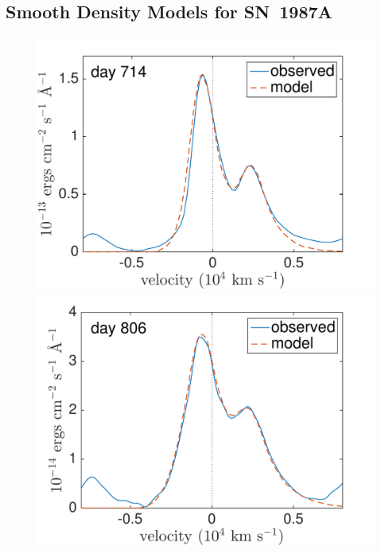 \subsection{Smooth Density Models for SN~1987A}
\label{smooth_models}
\begin{figure}
\centering
\includegraphics[trim =0 33 0 0,clip=true,scale=0.37]{chapters/chapter5/images/smooth/best_fit/d714OI.pdf}
\hspace{0mm}
\includegraphics[trim = 0 33 0 0,clip=true,scale=0.37]{chapters/chapter5/images/smooth/best_fit/d806OI_ext.pdf}


\end{figure}
